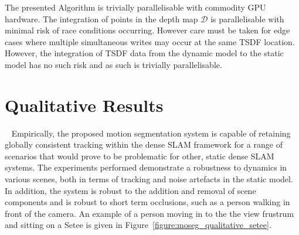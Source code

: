 The presented Algorithm is trivially parallelisable with commodity GPU hardware.
The integration of points in the depth map \( \mathcal{D} \) is parallelisable 
with minimal risk of race conditions occurring. However care must be taken for edge 
cases where multiple simultaneous writes may occur at the same TSDF location. 
However, the integration of TSDF data from the dynamic model to the static model 
has no such risk and as such is trivially parallelisable.

\section{Qualitative Results}
~\label{sec:moseg_qualitative}
Empirically, the proposed motion segmentation system is capable of retaining
globally consistent tracking within the dense SLAM framework for a range of
scenarios that would prove to be problematic for other, static dense SLAM
systems. The experiments performed demonstrate a robustness	to dynamics in
various scenes, both in terms of tracking and noise artefacts in the static
model. In addition, the system is robust to the addition and removal of scene
components and is robust to short term occlusions, such as a person walking in
front of the camera. An example of a person moving in to the the view frustrum
and sitting on a Setee is given in Figure~\ref{figure:moseg_qualitative_setee}.


